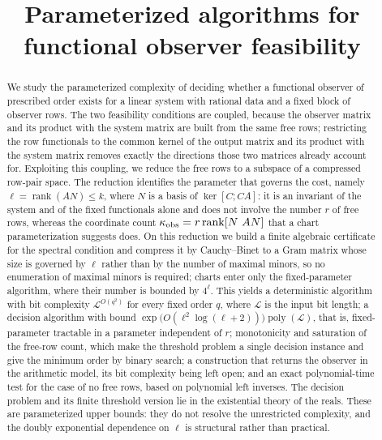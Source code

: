 \documentclass[journal]{IEEEtran}
\theoremstyle{plainn}
\theoremstyle{remark}
\begin{document}
\title{Parameterized algorithms for functional observer feasibility}
\author{}
\maketitle

\begin{abstract}
We study the parameterized complexity of deciding whether a functional observer of prescribed
order exists for a linear system with rational data and a fixed block of observer rows. The two
feasibility conditions are coupled, because the observer matrix and its product with the system
matrix are built from the same free rows; restricting the row functionals to the common kernel of
the output matrix and its product with the system matrix removes exactly the directions those two
matrices already account for. Exploiting this coupling, we reduce the free rows to a subspace of a
compressed row-pair space. The reduction identifies the parameter that governs the cost, namely
$\ell=\operatorname{rank}(AN)\le k$, where $N$ is a basis of $\ker[C;CA]$: it is an invariant of
the system and of the fixed functionals alone and does not involve the number $r$ of free rows,
whereas the coordinate count $\kappa_{\rm obs}=r\operatorname{rank}[N\ AN]$ that a chart
parameterization suggests does. On this reduction we build a finite algebraic certificate for the
spectral condition and compress it by Cauchy--Binet to a Gram matrix whose size is governed by
$\ell$ rather than by the number of maximal minors, so no enumeration of maximal minors is required;
charts enter only the fixed-parameter algorithm, where their number is bounded by $4^{\ell}$. This yields a deterministic algorithm with bit complexity $\mathcal L^{O(q^2)}$ for
every fixed order $q$, where $\mathcal L$ is the input bit length; a decision algorithm with bound
$\exp\bigl(O(\ell^2\log(\ell+2))\bigr)\operatorname{poly}(\mathcal L)$, that is, fixed-parameter
tractable in a parameter independent of $r$; monotonicity and saturation of the free-row count,
which make the threshold problem a single decision instance and give the minimum order by binary
search; a construction that returns the observer in the arithmetic model, its bit complexity being
left open; and an exact polynomial-time test for the case of no free rows, based on polynomial left
inverses. The decision problem and its finite threshold version lie in the existential theory of
the reals. These are parameterized upper bounds: they do not resolve the unrestricted complexity,
and the doubly exponential dependence on $\ell$ is structural rather than practical.
\end{abstract}
\end{document}
